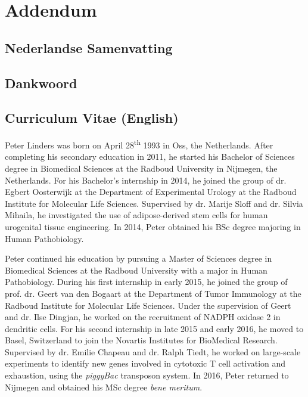 


\chapter{Addendum}

\clearpage
{}

\section{Nederlandse Samenvatting}



\clearpage

\section{Dankwoord}



\clearpage

\section{Curriculum Vitae (English)}

Peter Linders was born on April 28\textsuperscript{th} 1993 in Oss, the Netherlands. After completing his secondary education in 2011, he started his Bachelor of Sciences degree in Biomedical Sciences at the Radboud University in Nijmegen, the Netherlands. For his Bachelor's internship in 2014, he joined the group of dr. Egbert Oosterwijk at the Department of Experimental Urology at the Radboud Institute for Molecular Life Sciences. Supervised by dr. Marije Sloff and dr. Silvia Mihaila, he investigated the use of adipose-derived stem cells for human urogenital tissue engineering. In 2014, Peter obtained his BSc degree majoring in Human Pathobiology.

Peter continued his education by pursuing a Master of Sciences degree in Biomedical Sciences at the Radboud University with a major in Human Pathobiology. During his first internship in early 2015, he joined the group of prof. dr. Geert van den Bogaart at the Department of Tumor Immunology at the Radboud Institute for Molecular Life Sciences. Under the supervision of Geert and dr. Ilse Dingjan, he worked on the recruitment of NADPH oxidase 2 in dendritic cells. For his second internship in late 2015 and early 2016, he moved to Basel, Switzerland to join the Novartis Institutes for BioMedical Research. Supervised by dr. Emilie Chapeau and dr. Ralph Tiedt, he worked on large-scale experiments to identify new genes involved in cytotoxic T cell activation and exhaustion, using the \emph{piggyBac} transposon system. In 2016, Peter returned to Nijmegen and obtained his MSc degree \emph{bene meritum}.

